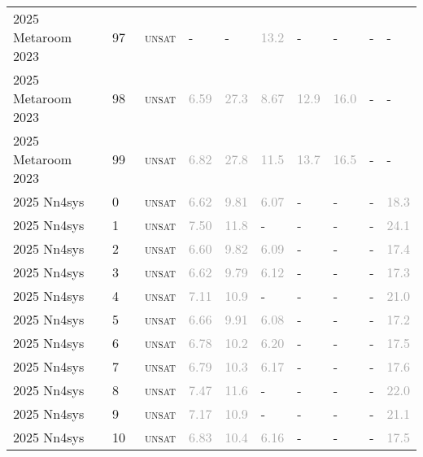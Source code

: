 \begin{center}
{\begin{longtable}{@{}llllllllll@{}}
2025 Metaroom 2023 & 97 & ~\textsc{unsat} & - & - & \textcolor{darkgray}{13.2} & - & - & - & - \\
2025 Metaroom 2023 & 98 & ~\textsc{unsat} & \textcolor{darkgray}{6.59} & \textcolor{darkgray}{27.3} & \textcolor{darkgray}{8.67} & \textcolor{darkgray}{12.9} & \textcolor{darkgray}{16.0} & - & - \\
2025 Metaroom 2023 & 99 & ~\textsc{unsat} & \textcolor{darkgray}{6.82} & \textcolor{darkgray}{27.8} & \textcolor{darkgray}{11.5} & \textcolor{darkgray}{13.7} & \textcolor{darkgray}{16.5} & - & - \\
\midrule
2025 Nn4sys & 0 & ~\textsc{unsat} & \textcolor{darkgray}{6.62} & \textcolor{darkgray}{9.81} & \textcolor{darkgray}{6.07} & - & - & - & \textcolor{darkgray}{18.3} \\
2025 Nn4sys & 1 & ~\textsc{unsat} & \textcolor{darkgray}{7.50} & \textcolor{darkgray}{11.8} & - & - & - & - & \textcolor{darkgray}{24.1} \\
2025 Nn4sys & 2 & ~\textsc{unsat} & \textcolor{darkgray}{6.60} & \textcolor{darkgray}{9.82} & \textcolor{darkgray}{6.09} & - & - & - & \textcolor{darkgray}{17.4} \\
2025 Nn4sys & 3 & ~\textsc{unsat} & \textcolor{darkgray}{6.62} & \textcolor{darkgray}{9.79} & \textcolor{darkgray}{6.12} & - & - & - & \textcolor{darkgray}{17.3} \\
2025 Nn4sys & 4 & ~\textsc{unsat} & \textcolor{darkgray}{7.11} & \textcolor{darkgray}{10.9} & - & - & - & - & \textcolor{darkgray}{21.0} \\
2025 Nn4sys & 5 & ~\textsc{unsat} & \textcolor{darkgray}{6.66} & \textcolor{darkgray}{9.91} & \textcolor{darkgray}{6.08} & - & - & - & \textcolor{darkgray}{17.2} \\
2025 Nn4sys & 6 & ~\textsc{unsat} & \textcolor{darkgray}{6.78} & \textcolor{darkgray}{10.2} & \textcolor{darkgray}{6.20} & - & - & - & \textcolor{darkgray}{17.5} \\
2025 Nn4sys & 7 & ~\textsc{unsat} & \textcolor{darkgray}{6.79} & \textcolor{darkgray}{10.3} & \textcolor{darkgray}{6.17} & - & - & - & \textcolor{darkgray}{17.6} \\
2025 Nn4sys & 8 & ~\textsc{unsat} & \textcolor{darkgray}{7.47} & \textcolor{darkgray}{11.6} & - & - & - & - & \textcolor{darkgray}{22.0} \\
2025 Nn4sys & 9 & ~\textsc{unsat} & \textcolor{darkgray}{7.17} & \textcolor{darkgray}{10.9} & - & - & - & - & \textcolor{darkgray}{21.1} \\
2025 Nn4sys & 10 & ~\textsc{unsat} & \textcolor{darkgray}{6.83} & \textcolor{darkgray}{10.4} & \textcolor{darkgray}{6.16} & - & - & - & \textcolor{darkgray}{17.5} \\

\end{longtable}}
\end{center}
